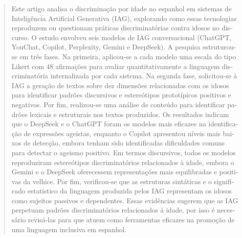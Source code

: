 \documentclass[spanish]{textolivre}
\begin{document}
\begin{polyabstract}
\begin{portuguese}
\begin{abstract}
Este artigo analisa o discriminação por idade no espanhol em sistemas de Inteligência Artificial Generativa (IAG), explorando como essas tecnologias reproduzem ou questionam práticas discriminatórias contra idosos no discurso. O estudo envolveu seis modelos de IAG conversacional (ChatGPT, YouChat, Copilot, Perplexity, Gemini e DeepSeek). A pesquisa estruturou-se em três fases. Na primeira, aplicou-se a cada modelo uma escala do tipo Likert com 48 afirmações para avaliar quantitativamente a linguagem discriminatória internalizada por cada sistema. Na segunda fase, solicitou-se à IAG a geração de textos sobre dez dimensões relacionadas com os idosos para identificar padrões discursivos e estereótipos prototípicos positivos e negativos. Por fim, realizou-se uma análise de conteúdo para identificar padrões lexicais e estruturais nos textos produzidos. Os resultados indicam que o DeepSeek e o ChatGPT foram os modelos mais eficazes na identificação de expressões ageistas, enquanto o Copilot apresentou níveis mais baixos de detecção, embora tenham sido identificadas dificuldades comuns para detectar o ageismo positivo. Em termos discursivos, todos os modelos reproduziram estereótipos discriminatórios relacionados à idade, embora o Gemini e o DeepSeek oferecessem representações mais equilibradas e positivas da velhice. Por fim, verificou-se que as estruturas sintáticas e o significado estatístico da linguagem produzida pelos IAG representam os idosos como sujeitos passivos e dependentes. Essas evidências sugerem que as IAG perpetuam padrões discriminatórios relacionados à idade, por isso é necessário revisá-las para que atuem como ferramentas eficazes na promoção de uma linguagem inclusiva em espanhol.

\end{abstract}
\end{portuguese}


\end{polyabstract}
\end{document}
